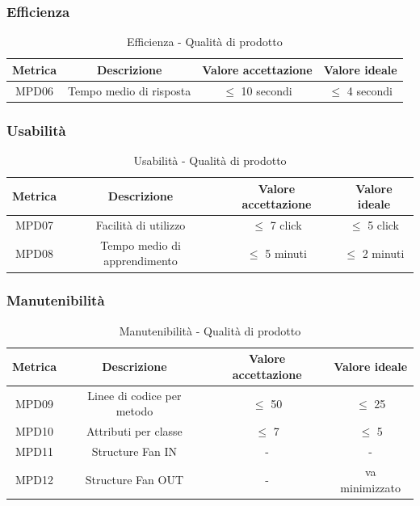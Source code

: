 \documentclass[10pt]{article}
\begin{document}
\begin{justify}
\subsubsection{Efficienza}
\begin{table}[H]
  \centering
\begin{tabular}{|c|c|c|c|}
  \hline
  \textbf{Metrica} & \textbf{Descrizione} & \textbf{Valore accettazione} & \textbf{Valore ideale}\\
  \hline
  MPD06 & Tempo medio di risposta & $\leq$ 10 secondi & $\leq$ 4 secondi \\
  \hline
\end{tabular}
\caption{Efficienza - Qualità di prodotto}
\label{tab:efficienza}
\end{table}

\subsubsection{Usabilità}
\begin{table}[H]
  \centering
\begin{tabular}{|c|c|c|c|}
  \hline
  \textbf{Metrica} & \textbf{Descrizione} & \textbf{Valore accettazione} & \textbf{Valore ideale}\\
  \hline
  MPD07 & Facilità di utilizzo & $\leq$ 7 click & $\leq$ 5 click\\
  \hline
  MPD08 & Tempo medio di apprendimento & $\leq$ 5 minuti & $\leq$ 2 minuti \\
  \hline
\end{tabular}
\caption{Usabilità - Qualità di prodotto}
\label{tab:usabilità}
\end{table}

\subsubsection{Manutenibilità}
\begin{table}[H]
  \centering
\begin{tabular}{|c|c|c|c|}
  \hline
  \textbf{Metrica} & \textbf{Descrizione} & \textbf{Valore accettazione} & \textbf{Valore ideale}\\
  \hline
  MPD09 & Linee di codice per metodo & $\leq$ 50 & $\leq$ 25 \\
  \hline
  MPD10 & Attributi per classe & $\leq$ 7 & $\leq$ 5 \\
  \hline
  MPD11 & Structure Fan IN & - & - \\
  \hline
  MPD12 & Structure Fan OUT & - & va minimizzato \\
  \hline
\end{tabular}
\caption{Manutenibilità - Qualità di prodotto}
\label{tab:manutenibilità}
\end{table}


\end{justify}
\end{document}
